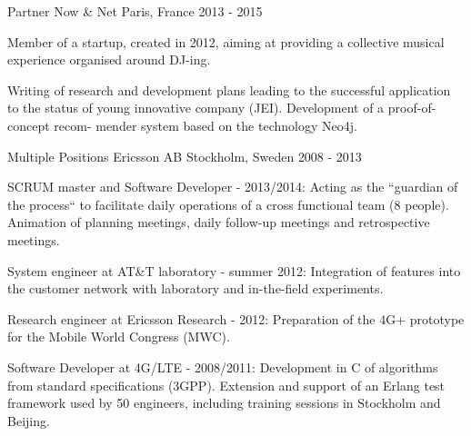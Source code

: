 

\begin{cventries}

  \cventry
    {Partner} %
    {Now \& Net} %
    {Paris, France} %
    {2013 - 2015} %
    {
      \begin{cvitems} %
        \item {Member of a startup, created in 2012, aiming at providing a collective musical experience organised around DJ-ing.}
        \item {Writing of research and development plans leading to the successful application to the status of young innovative company (JEI). Development of a proof-of-concept recom- mender system based on the technology Neo4j.}
      \end{cvitems}
    }

  \cventry
    {Multiple Positions} %
    {Ericsson AB} %
    {Stockholm, Sweden} %
    {2008 - 2013} %
    {
      \begin{cvitems} %
        \item {SCRUM master and Software Developer - 2013/2014: Acting as the “guardian of the process“ to facilitate daily operations of a cross functional team (8 people). Animation of planning meetings, daily follow-up meetings and retrospective meetings.}
        \item {System engineer at AT\&T laboratory - summer 2012: Integration of features into the customer network with laboratory and in-the-field experiments.}
        \item {Research engineer at Ericsson Research - 2012: Preparation of the 4G+ prototype for the Mobile World Congress (MWC).}
        \item {Software Developer at 4G/LTE - 2008/2011: Development in C of algorithms from standard specifications (3GPP). Extension and support of an Erlang test framework used by 50 engineers, including training sessions in Stockholm and Beijing.}
      \end{cvitems}
    }

\end{cventries}
